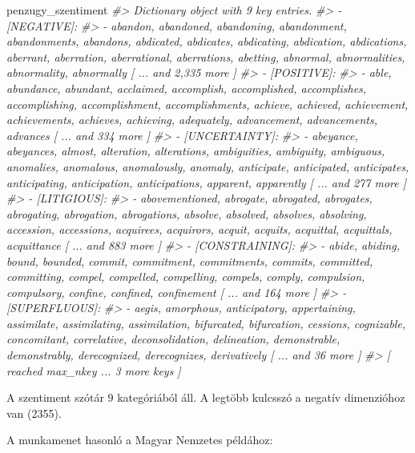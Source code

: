 \documentclass[
]{book}
\newenvironment{Shaded}{\begin{snugshade}}{\end{snugshade}}
\newcommand{\CommentTok}[1]{\textcolor[rgb]{0.56,0.35,0.01}{\textit{#1}}}
\newcommand{\NormalTok}[1]{#1}
\begin{document}
\begin{Shaded}
\begin{Highlighting}[]
\NormalTok{penzugy\_szentiment}
\CommentTok{\#\textgreater{} Dictionary object with 9 key entries.}
\CommentTok{\#\textgreater{} {-} [NEGATIVE]:}
\CommentTok{\#\textgreater{}   {-} abandon, abandoned, abandoning, abandonment, abandonments, abandons, abdicated, abdicates, abdicating, abdication, abdications, aberrant, aberration, aberrational, aberrations, abetting, abnormal, abnormalities, abnormality, abnormally [ ... and 2,335 more ]}
\CommentTok{\#\textgreater{} {-} [POSITIVE]:}
\CommentTok{\#\textgreater{}   {-} able, abundance, abundant, acclaimed, accomplish, accomplished, accomplishes, accomplishing, accomplishment, accomplishments, achieve, achieved, achievement, achievements, achieves, achieving, adequately, advancement, advancements, advances [ ... and 334 more ]}
\CommentTok{\#\textgreater{} {-} [UNCERTAINTY]:}
\CommentTok{\#\textgreater{}   {-} abeyance, abeyances, almost, alteration, alterations, ambiguities, ambiguity, ambiguous, anomalies, anomalous, anomalously, anomaly, anticipate, anticipated, anticipates, anticipating, anticipation, anticipations, apparent, apparently [ ... and 277 more ]}
\CommentTok{\#\textgreater{} {-} [LITIGIOUS]:}
\CommentTok{\#\textgreater{}   {-} abovementioned, abrogate, abrogated, abrogates, abrogating, abrogation, abrogations, absolve, absolved, absolves, absolving, accession, accessions, acquirees, acquirors, acquit, acquits, acquittal, acquittals, acquittance [ ... and 883 more ]}
\CommentTok{\#\textgreater{} {-} [CONSTRAINING]:}
\CommentTok{\#\textgreater{}   {-} abide, abiding, bound, bounded, commit, commitment, commitments, commits, committed, committing, compel, compelled, compelling, compels, comply, compulsion, compulsory, confine, confined, confinement [ ... and 164 more ]}
\CommentTok{\#\textgreater{} {-} [SUPERFLUOUS]:}
\CommentTok{\#\textgreater{}   {-} aegis, amorphous, anticipatory, appertaining, assimilate, assimilating, assimilation, bifurcated, bifurcation, cessions, cognizable, concomitant, correlative, deconsolidation, delineation, demonstrable, demonstrably, derecognized, derecognizes, derivatively [ ... and 36 more ]}
\CommentTok{\#\textgreater{} [ reached max\_nkey ... 3 more keys ]}
\end{Highlighting}
\end{Shaded}

A szentiment szótár 9 kategóriából áll. A legtöbb kulcsszó a negatív
dimenzióhoz van (2355).

A munkamenet hasonló a Magyar Nemzetes példához:
\end{document}
